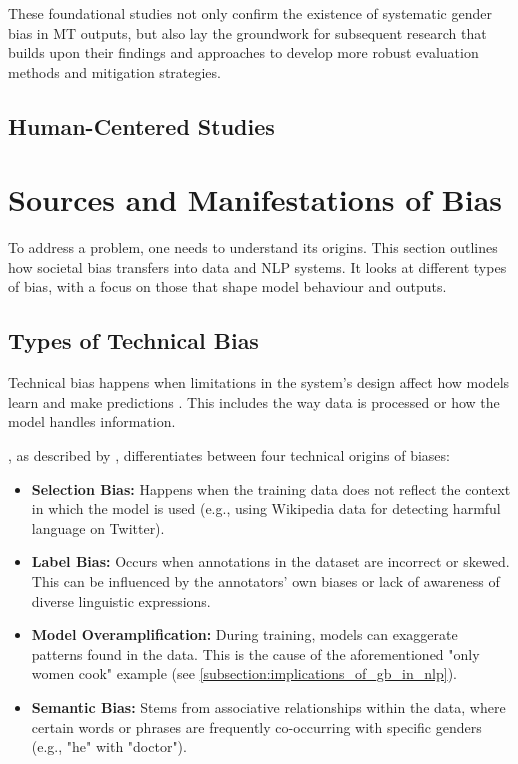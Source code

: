 These foundational studies not only confirm the existence of systematic gender bias in MT outputs, but also lay the groundwork for subsequent research that builds upon their findings and approaches to develop more robust evaluation methods and mitigation strategies.

\subsection{Human-Centered Studies}


\section{Sources and Manifestations of Bias}

To address a problem, one needs to understand its origins. This section outlines how societal bias transfers into data and NLP systems. It looks at different types of bias, with a focus on those that shape model behaviour and outputs.

\subsection{Types of Technical Bias}
Technical bias happens when limitations in the system's design affect how models learn and make predictions \citep{stanczakSurveyGenderBias2021}. This includes the way data is processed or how the model handles information.

\citet{shahPredictiveBiasesNatural2020}, as described by \citet{ullmannGenderBiasMachine2022}, differentiates between four technical origins of biases:

\begin{itemize}
    \item \textbf{Selection Bias:} Happens when the training data does not reflect the context in which the model is used (e.g., using Wikipedia data for detecting harmful language on Twitter).
    
    \item \textbf{Label Bias:} Occurs when annotations in the dataset are incorrect or skewed. This can be influenced by the annotators' own biases or lack of awareness of diverse linguistic expressions.

    \item \textbf{Model Overamplification:} During training, models can exaggerate patterns found in the data. This is the cause of the aforementioned "only women cook" example (see \autoref{subsection:implications_of_gb_in_nlp}).

    \item \textbf{Semantic Bias:} Stems from associative relationships within the data, where certain words or phrases are frequently co-occurring with specific genders (e.g., "he" with "doctor").
\end{itemize}


